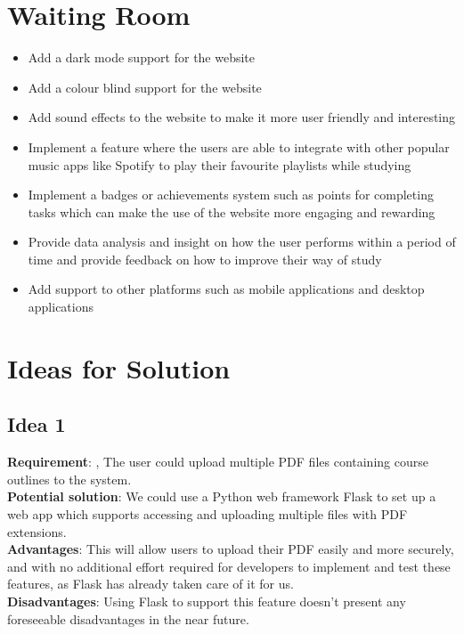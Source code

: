 \documentclass[12pt]{article}
\begin{document}
\section{Waiting Room}
\begin{itemize}
  \item Add a dark mode support for the website
  \item Add a colour blind support for the website
  \item Add sound effects to the website to make it more user friendly and interesting
  \item Implement a feature where the users are able to integrate with other popular music apps like Spotify to play their favourite playlists while studying
  \item Implement a badges or achievements system such as points for completing tasks which can make the use of the website more engaging and rewarding 
  \item Provide data analysis and insight on how the user performs within a period of time and provide feedback on how to improve their way of study
  \item Add support to other platforms such as mobile applications and desktop applications
\end{itemize}

\section{Ideas for Solution}
\subsection{Idea 1}
\textbf{Requirement}: , The user could upload multiple PDF files containing course outlines to the system. \\
\textbf{Potential solution}: We could use a Python web framework Flask to set up a web app which supports accessing and uploading multiple files with PDF extensions.\\
\textbf{Advantages}: This will allow users to upload their PDF easily and more securely, and with no additional effort required for developers to implement and test these features, as Flask has already taken care of it for us.\\
\textbf{Disadvantages}: Using Flask to support this feature doesn't present any foreseeable disadvantages in the near future. \\
\end{document}
